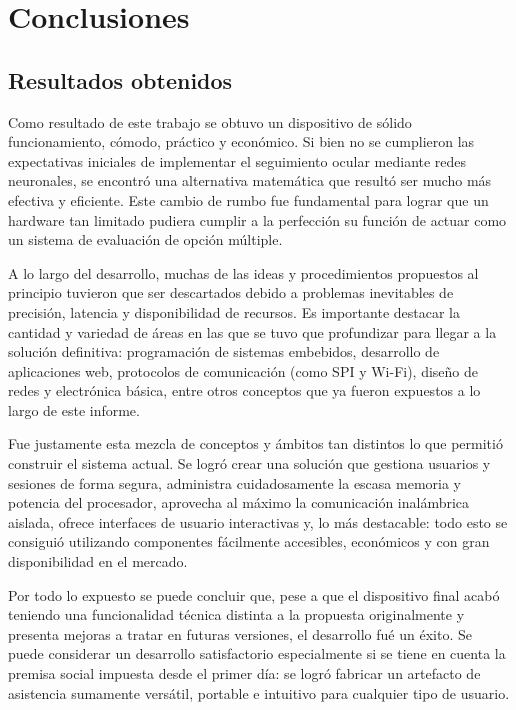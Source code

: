 
\chapter{Conclusiones} %

\label{Chapter5} %
\label{conclusiones}


\section{Resultados obtenidos}

Como resultado de este trabajo se obtuvo un dispositivo de sólido funcionamiento, cómodo, práctico y económico. Si bien no se cumplieron las expectativas iniciales de implementar el seguimiento ocular mediante redes neuronales, se encontró una alternativa matemática que resultó ser mucho más efectiva y eficiente. Este cambio de rumbo fue fundamental para lograr que un hardware tan limitado pudiera cumplir a la perfección su función de actuar como un sistema de evaluación de opción múltiple.

A lo largo del desarrollo, muchas de las ideas y procedimientos propuestos al principio tuvieron que ser descartados debido a problemas inevitables de precisión, latencia y disponibilidad de recursos. Es importante destacar la cantidad y variedad de áreas en las que se tuvo que profundizar para llegar a la solución definitiva: programación de sistemas embebidos, desarrollo de aplicaciones web, protocolos de comunicación (como SPI y Wi-Fi), diseño de redes y electrónica básica, entre otros conceptos que ya fueron expuestos a lo largo de este informe.

Fue justamente esta mezcla de conceptos y ámbitos tan distintos lo que permitió construir el sistema actual. Se logró crear una solución que gestiona usuarios y sesiones de forma segura, administra cuidadosamente la escasa memoria y potencia del procesador, aprovecha al máximo la comunicación inalámbrica aislada, ofrece interfaces de usuario interactivas y, lo más destacable: todo esto se consiguió utilizando componentes fácilmente accesibles, económicos y con gran disponibilidad en el mercado.

Por todo lo expuesto se puede concluir que, pese a que el dispositivo final acabó teniendo una funcionalidad técnica distinta a la propuesta originalmente y presenta mejoras a tratar en futuras versiones, el desarrollo fué un éxito. Se puede considerar un desarrollo satisfactorio especialmente si se tiene en cuenta la premisa social impuesta desde el primer día: se logró fabricar un artefacto de asistencia sumamente versátil, portable e intuitivo para cualquier tipo de usuario.


